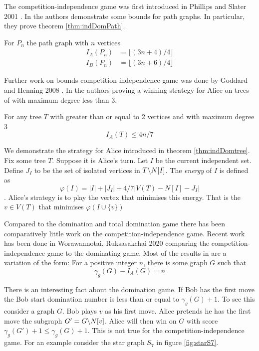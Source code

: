 The competition-independence game was first introduced in Phillips and Slater 2001 \cite{PhillpsSlater2001}. In \cite{PhillpsSlater2001} the authors demonstrate some bounds for path graphs. In particular, they prove theorem \ref{thm:indDomPath}.
\begin{theorem}\label{thm:indDomPath}
    For $P_n$ the path graph with $n$ vertices
    \begin{align*}
    I_A(P_n) &=\lfloor(3n+4)/4\rfloor\\
    I_B(P_n) &=\lfloor(3n+6)/4\rfloor       
    \end{align*} 
\end{theorem}
Further work on bounds competition-independence game was done by Goddard and Henning 2008 \cite{GoddardHenning2018}. In \cite{GoddardHenning2018} the authors proving a winning strategy for Alice on trees of with maximum degree less than 3.

\begin{theorem}    \label{thm:indDomtree}
For any tree $T$ with greater than or equal to 2 vertices and with maximum degree 3 
\[I_A(T)\leq 4n/7\]
\end{theorem}

We demonstrate the strategy for Alice introduced in theorem \ref{thm:indDomtree}. Fix some tree $T$. Suppose it is Alice's turn. Let $I$ be the current independent set. Define $J_I$ to be the set of isolated vertices in $T\backslash N[I]$. The \textit{energy} of $I$ is defined as \[\varphi(I) = |I| + |J_I| + 4/7|V(T) - N[I] - J_I|\]. Alice's strategy is to play the vertex  that minimises this energy. That is the $v\in V(T)$ that minimises $\varphi(I\cup\{v\})$

Compared to the domination and total domination game there has been comparatively little work on the competition-independence game. 
Recent work has been done in Worawannotai, Ruksasakchai 2020 \cite{WorRuk2020} comparing the competition-independence game to the dominating game. Most of the results in \cite{WorRuk2020} are a variation of the form: For a positive integer $n$, there is some graph $G$ such that
\[\gamma_g(G) - I_A(G) = n\]

There is an interesting fact about the domination game. If Bob has the first move the Bob start domination number is less than or equal to $\gamma_g(G) +1$. To see this consider a graph $G$. Bob plays $v$ as his first move. Alice pretends he has the first move the subgraph $G'=G\backslash N[v]$. Alice will then win on $G$ with score $\gamma_g(G')+1\leq \gamma_g(G)+1$.   
This is not true for the competition-independence game. For an example consider the star graph $S_7$ in figure \ref{fig:starS7}. 

